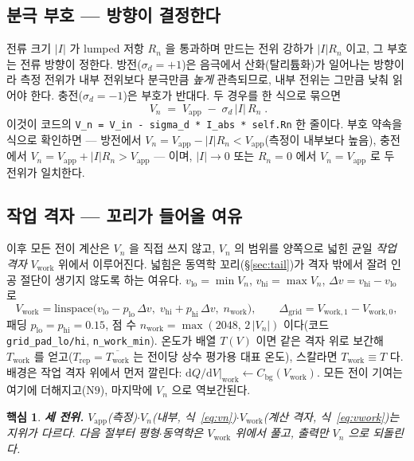 \documentclass[11pt,a4paper]{article}
\newtheorem*{keybox}{핵심}
\newcommand{\dd}{\mathrm{d}}
\newcommand{\app}{\mathrm{app}}
\newcommand{\bg}{\mathrm{bg}}
\newcommand{\work}{\mathrm{work}}
\newcommand{\code}[1]{\texttt{#1}}
\begin{document}
\subsection{분극 부호 — 방향이 결정한다}
전류 크기 $|I|$ 가 lumped 저항 $R_n$ 을 통과하며 만드는 전위 강하가 $|I|R_n$ 이고, 그 부호는 전류 방향이 정한다.
방전($\sigma_d=+1$)은 음극에서 산화(탈리튬화)가 일어나는 방향이라 측정 전위가 내부 전위보다 분극만큼 \emph{높게}
관측되므로, 내부 전위는 그만큼 낮춰 읽어야 한다. 충전($\sigma_d=-1$)은 부호가 반대다. 두 경우를 한 식으로 묶으면
\begin{equation}
\boxed{\;V_n\;=\;V_\app\;-\;\sigma_d\,|I|\,R_n\;.}
\label{eq:vn}
\end{equation}
이것이 코드의 \code{V\_n = V\_in - sigma\_d * I\_abs * self.Rn} 한 줄이다. 부호 약속을 식으로 확인하면 —
방전에서 $V_n=V_\app-|I|R_n<V_\app$(측정이 내부보다 높음), 충전에서 $V_n=V_\app+|I|R_n>V_\app$ — 이며,
$|I|\to0$ 또는 $R_n=0$ 에서 $V_n=V_\app$ 로 두 전위가 일치한다.

\subsection{작업 격자 — 꼬리가 들어올 여유}
이후 모든 전이 계산은 $V_n$ 을 직접 쓰지 않고, $V_n$ 의 범위를 양쪽으로 넓힌 균일 \emph{작업 격자} $V_\work$ 위에서
이루어진다. 넓힘은 동역학 꼬리(\S\ref{sec:tail})가 격자 밖에서 잘려 인공 절단이 생기지 않도록 하는 여유다.
$v_\mathrm{lo}=\min V_n$, $v_\mathrm{hi}=\max V_n$, $\Delta v=v_\mathrm{hi}-v_\mathrm{lo}$ 로
\begin{equation}
V_\work=\mathrm{linspace}\big(v_\mathrm{lo}-p_\mathrm{lo}\,\Delta v,\;
v_\mathrm{hi}+p_\mathrm{hi}\,\Delta v,\;n_\work\big),
\qquad \Delta_\mathrm{grid}=V_{\work,1}-V_{\work,0},
\label{eq:vwork}
\end{equation}
패딩 $p_\mathrm{lo}=p_\mathrm{hi}=0.15$, 점 수 $n_\work=\max(2048,\,2\,|V_n|)$ 이다(코드 \code{grid\_pad\_lo/hi},
\code{n\_work\_min}). 온도가 배열 $T(V)$ 이면 같은 격자 위로 보간해 $T_\work$ 를 얻고($T_\mathrm{rep}=\overline{T_\work}$ 는
전이당 상수 평가용 대표 온도), 스칼라면 $T_\work\equiv T$ 다. 배경은 작업 격자 위에서 먼저 깔린다:
$\dd Q/\dd V|_\work \leftarrow C_\bg(V_\work)$. 모든 전이 기여는 여기에 더해지고($\mathrm N9$), 마지막에 $V_n$ 으로
역보간된다.

\begin{keybox}
\textbf{세 전위.} $V_\app$(측정)$\cdot$$V_n$(내부, 식~\eqref{eq:vn})$\cdot$$V_\work$(계산 격자, 식~\eqref{eq:vwork})는
지위가 다르다. 다음 절부터 평형$\cdot$동역학은 $V_\work$ 위에서 풀고, 출력만 $V_n$ 으로 되돌린다.
\end{keybox}
\end{document}
